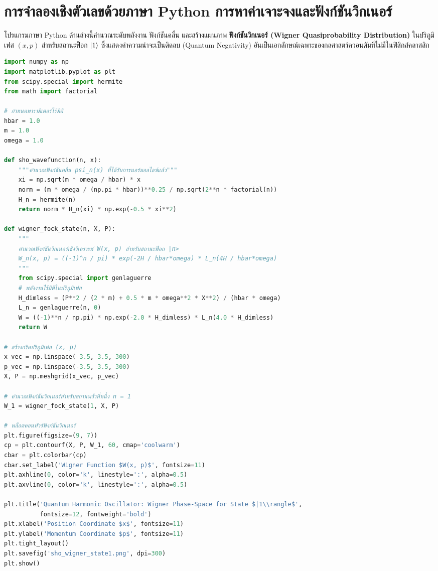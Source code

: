 \section{การจำลองเชิงตัวเลขด้วยภาษา Python การหาค่าเจาะจงและฟังก์ชันวิกเนอร์}
\label{sec_python_sho_wigner}

โปรแกรมภาษา Python ด้านล่างนี้คำนวณระดับพลังงาน ฟังก์ชันคลื่น และสร้างแผนภาพ \textbf{ฟังก์ชันวิกเนอร์ (Wigner Quasiprobability Distribution)} ในปริภูมิเฟส $(x, p)$ สำหรับสถานะฟ็อก $\ket{1}$ ซึ่งแสดงค่าความน่าจะเป็นติดลบ (Quantum Negativity) อันเป็นเอกลักษณ์เฉพาะของกลศาสตร์ควอนตัมที่ไม่มีในฟิสิกส์คลาสสิก

\begin{lstlisting}[language=Python, caption={การจำลองตัวแกว่งกวัดฮาร์มอนิกควอนตัมและฟังก์ชันวิกเนอร์ด้วย Python}, label={code_sho_wigner}]
import numpy as np
import matplotlib.pyplot as plt
from scipy.special import hermite
from math import factorial

# กำหนดพารามิเตอร์ไร้มิติ
hbar = 1.0
m = 1.0
omega = 1.0

def sho_wavefunction(n, x):
    """คำนวณฟังก์ชันคลื่น psi_n(x) ที่ได้รับการนอร์มอลไลซ์แล้ว"""
    xi = np.sqrt(m * omega / hbar) * x
    norm = (m * omega / (np.pi * hbar))**0.25 / np.sqrt(2**n * factorial(n))
    H_n = hermite(n)
    return norm * H_n(xi) * np.exp(-0.5 * xi**2)

def wigner_fock_state(n, X, P):
    """
    คำนวณฟังก์ชันวิกเนอร์เชิงวิเคราะห์ W(x, p) สำหรับสถานะฟ็อก |n>
    W_n(x, p) = ((-1)^n / pi) * exp(-2H / hbar*omega) * L_n(4H / hbar*omega)
    """
    from scipy.special import genlaguerre
    # พลังงานไร้มิติในปริภูมิเฟส
    H_dimless = (P**2 / (2 * m) + 0.5 * m * omega**2 * X**2) / (hbar * omega)
    L_n = genlaguerre(n, 0)
    W = ((-1)**n / np.pi) * np.exp(-2.0 * H_dimless) * L_n(4.0 * H_dimless)
    return W

# สร้างกริดปริภูมิเฟส (x, p)
x_vec = np.linspace(-3.5, 3.5, 300)
p_vec = np.linspace(-3.5, 3.5, 300)
X, P = np.meshgrid(x_vec, p_vec)

# คำนวณฟังก์ชันวิกเนอร์สำหรับสถานะเร้าที่หนึ่ง n = 1
W_1 = wigner_fock_state(1, X, P)

# พล็อตคอนทัวร์ฟังก์ชันวิกเนอร์
plt.figure(figsize=(9, 7))
cp = plt.contourf(X, P, W_1, 60, cmap='coolwarm')
cbar = plt.colorbar(cp)
cbar.set_label('Wigner Function $W(x, p)$', fontsize=11)
plt.axhline(0, color='k', linestyle=':', alpha=0.5)
plt.axvline(0, color='k', linestyle=':', alpha=0.5)

plt.title('Quantum Harmonic Oscillator: Wigner Phase-Space for State $|1\\rangle$', 
          fontsize=12, fontweight='bold')
plt.xlabel('Position Coordinate $x$', fontsize=11)
plt.ylabel('Momentum Coordinate $p$', fontsize=11)
plt.tight_layout()
plt.savefig('sho_wigner_state1.png', dpi=300)
plt.show()
\end{lstlisting}

